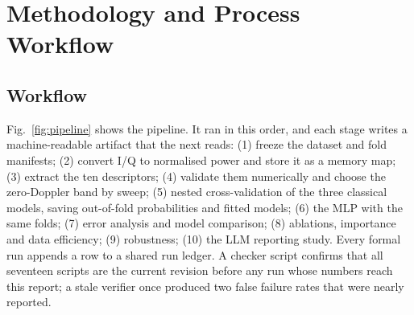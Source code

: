 \documentclass[conference]{IEEEtran}
\begin{document}
\section{Methodology and Process Workflow}
\subsection{Workflow}
Fig.~\ref{fig:pipeline} shows the pipeline. It ran in this order, and each stage writes a machine-readable artifact that the next reads: (1) freeze the dataset and fold manifests; (2) convert I/Q to normalised power and store it as a memory map; (3) extract the ten descriptors; (4) validate them numerically and choose the zero-Doppler band by sweep; (5) nested cross-validation of the three classical models, saving out-of-fold probabilities and fitted models; (6) the MLP with the same folds; (7) error analysis and model comparison; (8) ablations, importance and data efficiency; (9) robustness; (10) the LLM reporting study. Every formal run appends a row to a shared run ledger. A checker script confirms that all seventeen scripts are the current revision before any run whose numbers reach this report; a stale verifier once produced two false failure rates that were nearly reported.
\end{document}
